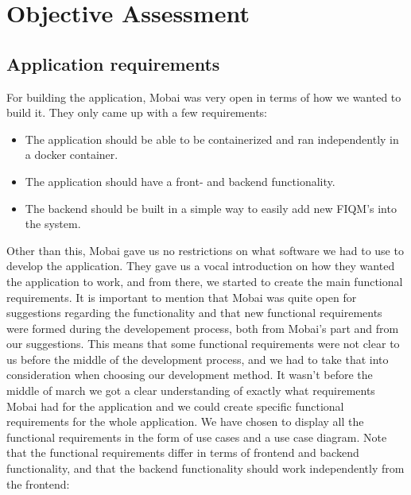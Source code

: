 \chapter{Objective Assessment}
\label{chap:objective}

\section{Application requirements}
For building the application, Mobai was very open in terms of how we wanted to build it. They only came up with a few requirements:
\begin{itemize}
    \item The application should be able to be containerized and ran independently in a docker container.
    \item The application should have a front- and backend functionality.
    \item The backend should be built in a simple way to easily add new FIQM's into the system.
\end{itemize}
Other than this, Mobai gave us no restrictions on what software we had to use to develop the application. They gave us a vocal introduction on how they wanted the application to work, and from there, we started to create the main functional requirements. It is important to mention that Mobai was quite open for suggestions regarding the functionality and that new functional requirements were formed during the developement process, both from Mobai's part and from our suggestions. This means that some functional requirements were not clear to us before the middle of the development process, and we had to take that into consideration when choosing our development method. It wasn't before the middle of march we got a clear understanding of exactly what requirements Mobai had for the application and we could create specific functional requirements for the whole application. We have chosen to display all the functional requirements in the form of use cases and a use case diagram. Note that the functional requirements differ in terms of frontend and backend functionality, and that the backend functionality should work independently from the frontend:         

